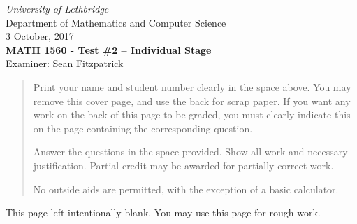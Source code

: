 \documentclass[12pt]{article}
\newcommand{\skipline}{\vspace{12pt}}
\begin{document}
\author{Instructor: Sean Fitzpatrick}
\thispagestyle{plain}
\begin{center}
\emph{University of Lethbridge}\\
Department of Mathematics and Computer Science\\
3 October, 2017\\
{\bf MATH 1560 - Test \#2 -- Individual Stage}\\
Examiner: Sean Fitzpatrick
\end{center}



\vspace{0.1in}

\vspace*{\fill}

\begin{quote}
Print your name and student number clearly in the space above. You may remove this cover page, and use the back for scrap paper. If you want any work on the back of this page to be graded, you must clearly indicate this on the page containing the corresponding question.

\medskip

Answer the questions in the space provided. Show all work and necessary justification. Partial credit may be awarded for partially correct work.
 
\medskip

No outside aids are permitted, with the exception of a basic calculator. 
\end{quote}



\newpage

This page left intentionally blank. You may use this page for rough work.
\newpage
\end{document}
